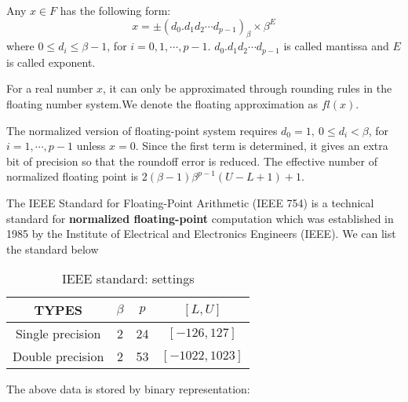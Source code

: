 \documentclass[12pt,a4paper]{extarticle}
\numberwithin{equation}{section}
\numberwithin{figure}{section}
\numberwithin{table}{section}
\theoremstyle{definition}
\begin{document}
Any $x\in F$ has the following form:
\begin{equation}
    x = \pm (d_0.d_1d_2\cdots d_{p-1})_{\beta}\times \beta^E
\end{equation}
where $0\leq d_i \leq \beta-1$, for $i=0,1,\cdots,p-1$. $d_0.d_1d_2\cdots d_{p-1}$ is called mantissa and $E$ is called exponent.\par 
For a real number $x$, it can only be approximated through rounding rules in the floating number system.We denote the floating approximation as $fl(x)$.\par 
The normalized version of floating-point system requires $d_0=1,\ 0\leq d_i<\beta$, for $i=1,\cdots,p-1$ unless $x=0$. Since the first term is determined, it gives an extra bit of precision so that the roundoff error is reduced. The effective number of normalized floating point is $2(\beta-1)\beta^{p-1}(U-L+1)+1$.\par 
The IEEE Standard for Floating-Point Arithmetic (IEEE 754) is a technical standard for {\bf normalized floating-point} computation which was established in 1985 by the Institute of Electrical and Electronics Engineers (IEEE). We can list the standard below
\begin{table}[!htbp]
    \small
    \centering
    \begin{tabular}{c|ccc}
        \toprule
        \toprule
        TYPES&$\beta$ & $p$ &$[L,U]$\\
        \midrule
        Single precision&2&24&$[-126,127]$\\
        Double precision&2&53&$[-1022,1023]$\\
        \bottomrule
        \bottomrule
    \end{tabular}
    \label{tab:ieee1}
    \caption{IEEE standard: settings}
\end{table}

The above data is stored by binary representation:
\begin{table}[!htbp]
    \small
    \centering
    \label{tab:ieee2}
    \caption{IEEE standard: storage}
\end{table}
\end{document}
